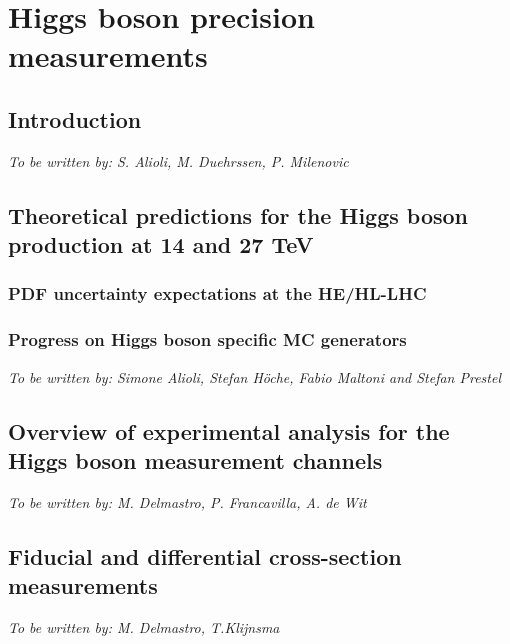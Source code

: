 \documentclass[../report.tex]{subfiles}
\providecommand{\main}{..}
\begin{document}
\section{Higgs boson precision measurements}

\subsection{Introduction}
\begin{center}{\it To be written by: S. Alioli, M. Duehrssen, P. Milenovic} \end{center}
\label{sec:2:introduction}


\subsection{Theoretical predictions for the Higgs boson production at 14 and 27 TeV}
\label{sec:2_HXSWG1}


\subsubsection{PDF uncertainty expectations at the HE/HL-LHC}


\subsubsection{Progress on Higgs boson specific MC generators}
\begin{center} {\it To be written by: Simone Alioli, Stefan H\"oche, Fabio Maltoni and Stefan Prestel} \end{center}


\subsection{Overview of experimental analysis for the Higgs boson measurement channels}
\begin{center}{\it To be written by: M. Delmastro, P. Francavilla, A. de Wit} \end{center}
\label{sec:2:channels}


\subsection{Fiducial and differential cross-section measurements}
\begin{center}{\it To be written by: M. Delmastro, T.Klijnsma} \end{center}
\label{sec:2:fiducial}

\end{document}
